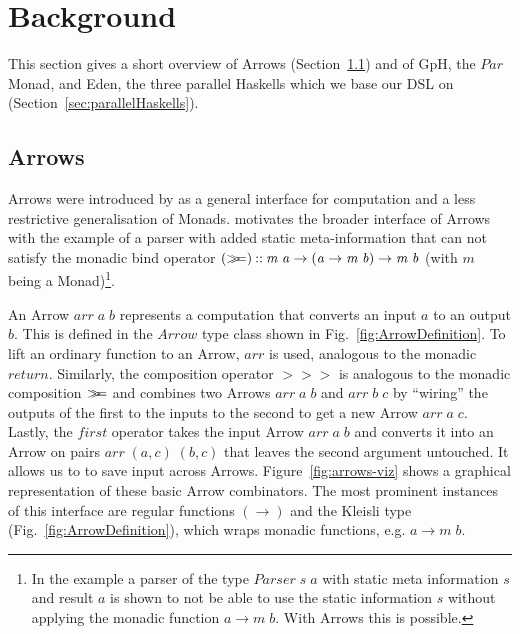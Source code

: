 \documentclass{jfp1}
\newcommand{\Conid}[1]{\mathit{#1}}
\newcommand{\Varid}[1]{\mathit{#1}}
\newcommand{\bind}{\mathbin{>\!\!\!>\mkern-6.7mu=}}
\begin{document}
        \section{Background}
	\label{sec:background}
	This section gives a short overview of Arrows
        (Section~\ref{sec:arrows}) and of GpH, the \ensuremath{\Conid{Par}} Monad, and
        Eden, the three parallel Haskells which we base our DSL on
        (Section~\ref{sec:parallelHaskells}).
	\subsection{Arrows}
\label{sec:arrows}
Arrows were introduced by \citet{HughesArrows} as a general interface for computation and a less restrictive generalisation of Monads. \citeauthor{HughesArrows} motivates the broader interface of Arrows with the example of a parser with added static meta-information that can not satisfy the monadic bind operator \ensuremath{(\bind )\mathbin{::}\Varid{m}\;\Varid{a}\to (\Varid{a}\to \Varid{m}\;\Varid{b})\to \Varid{m}\;\Varid{b}} (with \ensuremath{\Varid{m}} being a Monad)\footnote{In the example a parser of the type \ensuremath{\Conid{Parser}\;\Varid{s}\;\Varid{a}} with static meta information \ensuremath{\Varid{s}} and result \ensuremath{\Varid{a}} is shown to not be able to use the static information \ensuremath{\Varid{s}} without applying the monadic function \ensuremath{\Varid{a}\to \Varid{m}\;\Varid{b}}. With Arrows this is possible.}.

An Arrow \ensuremath{\Varid{arr}\;\Varid{a}\;\Varid{b}} represents a computation that converts an input \ensuremath{\Varid{a}} to an output \ensuremath{\Varid{b}}. This is defined in the \ensuremath{\Conid{Arrow}} type class shown in Fig.~\ref{fig:ArrowDefinition}.
%
To lift an ordinary function to an Arrow, \ensuremath{\Varid{arr}} is used, analogous to the monadic \ensuremath{\Varid{return}}. Similarly, the composition operator \ensuremath{\mathbin{>\!\!>\!\!>}} is analogous to the monadic composition \ensuremath{\bind } and combines two Arrows \ensuremath{\Varid{arr}\;\Varid{a}\;\Varid{b}} and \ensuremath{\Varid{arr}\;\Varid{b}\;\Varid{c}} by \enquote{wiring} the outputs of the first to the inputs to the second to get a new Arrow \ensuremath{\Varid{arr}\;\Varid{a}\;\Varid{c}}. Lastly, the \ensuremath{\Varid{first}} operator takes the input Arrow \ensuremath{\Varid{arr}\;\Varid{a}\;\Varid{b}} and converts it into an Arrow on pairs \ensuremath{\Varid{arr}\;(\Varid{a},\Varid{c})\;(\Varid{b},\Varid{c})} that leaves the second argument untouched. It allows us to to save input across Arrows. Figure~\ref{fig:arrows-viz} shows a graphical representation of these basic Arrow combinators.
The most prominent instances of this interface are regular functions \ensuremath{(\to )}
and the Kleisli type (Fig.~\ref{fig:ArrowDefinition}), which wraps monadic functions, e.g.  \ensuremath{\Varid{a}\to \Varid{m}\;\Varid{b}}.
\end{document}
